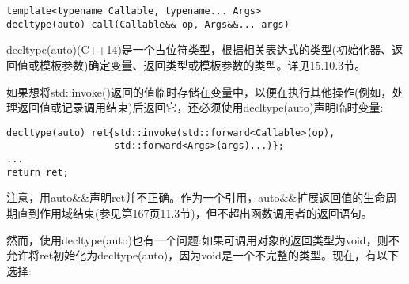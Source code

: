 \begin{lstlisting}[style=styleCXX]
template<typename Callable, typename... Args>
decltype(auto) call(Callable&& op, Args&&... args)
\end{lstlisting}

decltype(auto)(C++14)是一个占位符类型，根据相关表达式的类型(初始化器、返回值或模板参数)确定变量、返回类型或模板参数的类型。详见15.10.3节。

如果想将std::invoke()返回的值临时存储在变量中，以便在执行其他操作(例如，处理返回值或记录调用结束)后返回它，还必须使用decltype(auto)声明临时变量:

\begin{lstlisting}[style=styleCXX]
decltype(auto) ret{std::invoke(std::forward<Callable>(op),
				   std::forward<Args>(args)...)};
...
return ret;
\end{lstlisting}

注意，用auto\&\&声明ret并不正确。作为一个引用，auto\&\&扩展返回值的生命周期直到作用域结束(参见第167页11.3节)，但不超出函数调用者的返回语句。

然而，使用decltype(auto)也有一个问题:如果可调用对象的返回类型为void，则不允许将ret初始化为decltype(auto)，因为void是一个不完整的类型。现在，有以下选择:

